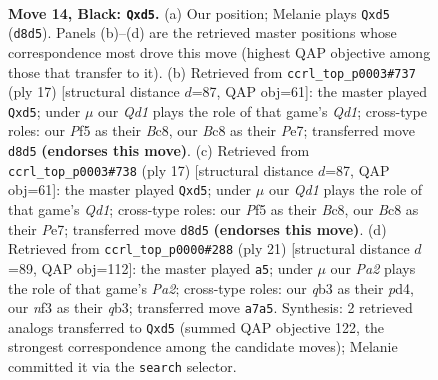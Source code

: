 \documentclass[11pt]{article}
\begin{document}
\begin{figure}[p]
\label{fig:thought-m25}
\end{figure}

\clearpage

\begin{figure}[p]\centering
\begin{subfigure}{0.46\textwidth}\centering
\resizebox{\linewidth}{!}{%
\newchessgame
\chessboard[
  setfen={r1bq1rk1/pp2n1bp/6p1/2pPpp1n/7P/1Q2PNP1/PP1P1P2/RNB1RK1B b - - 2 14},
  showmover=false,
  pgfstyle=straightmove, color=movearrow, markmove={d8-d5}
]}
\caption{}
\end{subfigure}\hfill
\begin{subfigure}{0.46\textwidth}\centering
\resizebox{\linewidth}{!}{%
\newchessgame
\chessboard[
  setfen={r1bq1rk1/pp2ppbp/1np2np1/3P4/3P4/1Q3NP1/PP2PPBP/RNB2RK1 b - - 2 9},
  showmover=false,
  pgfstyle=straightmove, color=movearrow, markmove={d8-d5}
]}
\caption{}
\end{subfigure}
\\[4pt]
\begin{subfigure}{0.46\textwidth}\centering
\resizebox{\linewidth}{!}{%
\newchessgame
\chessboard[
  setfen={r1bq1rk1/pp2ppbp/1np2np1/3P4/3P4/1Q3NP1/PP2PPBP/RNB2RK1 b - - 2 9},
  showmover=false,
  pgfstyle=straightmove, color=movearrow, markmove={d8-d5}
]}
\caption{}
\end{subfigure}\hfill
\begin{subfigure}{0.46\textwidth}\centering
\resizebox{\linewidth}{!}{%
\newchessgame
\chessboard[
  setfen={r1bq1rk1/p1n1ppbp/5np1/1p1P4/3P4/PQN3P1/1P2NPBP/R1B1K2R b KQ - 2 11},
  showmover=false,
  pgfstyle=straightmove, color=movearrow, markmove={a7-a5}
]}
\caption{}
\end{subfigure}
\caption{\textbf{Move 14, Black: \texttt{Qxd5}.} (a) Our position; Melanie plays \texttt{Qxd5} (\texttt{d8d5}). Panels (b)--(d) are the retrieved master positions whose correspondence most drove this move (highest QAP objective among those that transfer to it). (b) Retrieved from \texttt{ccrl\_top\_p0003\#737} (ply 17) [structural distance $d$=87, QAP obj=61]: the master played \texttt{Qxd5}; under $\mu$ our \emph{Qd1} plays the role of that game's \emph{Qd1}; cross-type roles: our \emph{P}f5 as their \emph{B}c8, our \emph{B}c8 as their \emph{P}e7; transferred move \texttt{d8d5} \textbf{(endorses this move)}. (c) Retrieved from \texttt{ccrl\_top\_p0003\#738} (ply 17) [structural distance $d$=87, QAP obj=61]: the master played \texttt{Qxd5}; under $\mu$ our \emph{Qd1} plays the role of that game's \emph{Qd1}; cross-type roles: our \emph{P}f5 as their \emph{B}c8, our \emph{B}c8 as their \emph{P}e7; transferred move \texttt{d8d5} \textbf{(endorses this move)}. (d) Retrieved from \texttt{ccrl\_top\_p0000\#288} (ply 21) [structural distance $d$=89, QAP obj=112]: the master played \texttt{a5}; under $\mu$ our \emph{Pa2} plays the role of that game's \emph{Pa2}; cross-type roles: our \emph{q}b3 as their \emph{p}d4, our \emph{n}f3 as their \emph{q}b3; transferred move \texttt{a7a5}. Synthesis: 2 retrieved analogs transferred to \texttt{Qxd5} (summed QAP objective 122, the strongest correspondence among the candidate moves); Melanie committed it via the \texttt{search} selector.}
\label{fig:thought-m27}
\end{figure}
\end{document}

